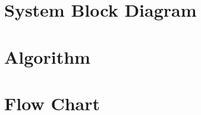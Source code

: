 \section{System Block Diagram}
\lipsum[4-8]
\section{Algorithm}
\lipsum[4-8]
\section{Flow Chart}
\lipsum[4-8]